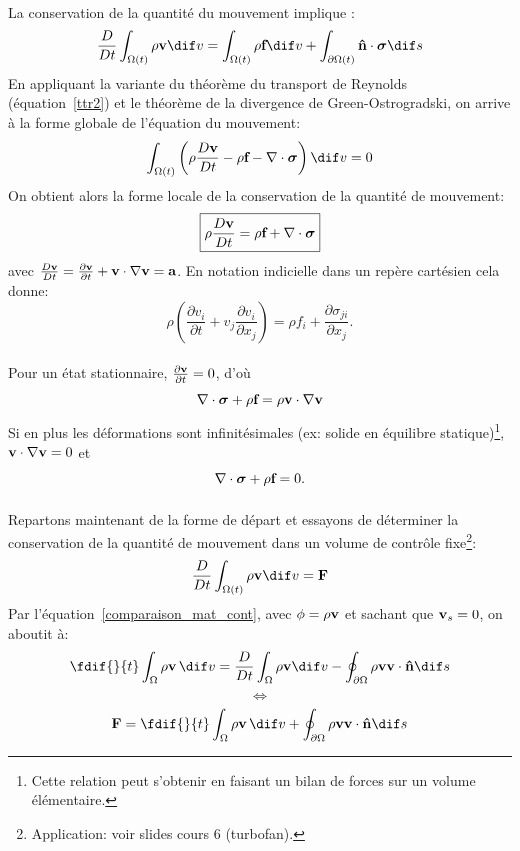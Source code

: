 \paragraph{}
La conservation de la quantité du mouvement implique :
$$\frac{D}{Dt}\int_{\Omega (t)}\rho\fv{v} \dif v=\int_{\Omega (t)}\rho\fv{f} \dif v+\int_{\partial\Omega (t)}\fv{\^n}\cdot\boldsymbol{\sigma} \dif s$$
En appliquant la variante du théorème du transport de Reynolds (équation~\eqref{ttr2}) et le théorème de la divergence de Green-Ostrogradski, on arrive à la forme globale de l'équation du mouvement:
$$\int_{\Omega (t)}\left(\rho\frac{D\fv{v}}{Dt}-\rho\fv{f}-\nabla\cdot\boldsymbol{\sigma}\right) \dif v=0$$
On obtient alors la forme locale de la conservation de la quantité de mouvement:
$$\boxed{\rho\frac{D\textbf{v}}{Dt}=\rho\textbf{f}+\nabla\cdot\boldsymbol{\sigma}}$$
avec $\frac{D\textbf{v}}{Dt}=\frac{\partial \textbf{v}}{\partial t}+\textbf{v}\cdot\nabla\textbf{v}=\textbf{a}$. En notation indicielle dans un repère cartésien cela donne:
$$\rho\left(\frac{\partial v_i}{\partial t}+v_j\frac{\partial v_i}{\partial x_j}\right)=\rho f_i+\frac{\partial \sigma_{ji}}{\partial x_j}.$$
\paragraph{}
Pour un état stationnaire, $\frac{\partial\textbf{v}}{\partial t}=0$, d'où $$\nabla\cdot\boldsymbol{\sigma}+\rho\textbf{f}=\rho\textbf{v}\cdot\nabla\textbf{v}$$
Si en plus les déformations sont infinitésimales (ex: solide en équilibre statique)\footnote{Cette relation peut s'obtenir en faisant un bilan de forces sur un volume élémentaire.}, $\textbf{v}\cdot\nabla\textbf{v}=0$ et
$$\nabla\cdot\boldsymbol{\sigma}+\rho\textbf{f}=0.$$
\paragraph{}
Repartons maintenant de la forme de départ et essayons de déterminer la conservation de la quantité de mouvement dans un volume de contrôle fixe\footnote{Application: voir slides cours 6 (turbofan).}:
$$\frac{D}{Dt}\int_{\Omega(t)}\rho\fv{v} \dif v=\fv{F}$$
Par l'équation~\eqref{comparaison_mat_cont}, avec $\phi=\rho\textbf{v}$ et sachant que $\textbf{v}_s=0$, on aboutit à:
$$\fdif{}{t}\int_{\Omega }\rho\fv{v}\,  \dif v=\frac{D}{Dt}\int_{\Omega}\rho\fv{v} \dif v-\oint_{\partial\Omega }\rho\fv{v}\fv{v}\cdot\fv{\^n} \dif s$$
$$\Leftrightarrow$$
$$\fv{F}=\fdif{}{t}\int_{\Omega}\rho\fv{v}\,  \dif v+\oint_{\partial\Omega }\rho\fv{v}\fv{v}\cdot\fv{\^n} \dif s$$

